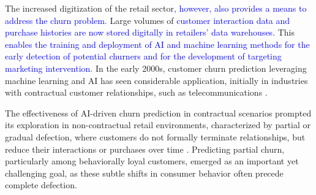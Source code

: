 \documentclass[preprint,12pt]{elsarticle}
\begin{document}

The increased digitization of the retail sector\textcolor{blue}{, however, also provides a means to address the churn problem.} Large volumes of \textcolor{blue}{customer interaction data and purchase histories are now stored digitally in retailers' data warehouses.} This \textcolor{blue}{enables the training and deployment of AI and machine learning methods for the early detection of potential churners and for the development of targeting marketing intervention.}
In the early 2000s, customer churn prediction leveraging machine learning and AI has seen considerable application, initially in industries with contractual customer relationships, such as telecommunications \cite{Predicting-subscriber-dissatisfaction-Mozer}. 

The effectiveness of AI-driven churn prediction in contractual scenarios prompted its exploration in non-contractual retail environments, characterized by partial or gradual defection, where customers do not formally terminate relationships, but reduce their interactions or purchases over time \cite{S37-ID826-Buckinx}. 
Predicting partial churn, particularly among behaviorally loyal customers, emerged as an important yet challenging goal, as these subtle shifts in consumer behavior often precede complete defection.


\end{document}
